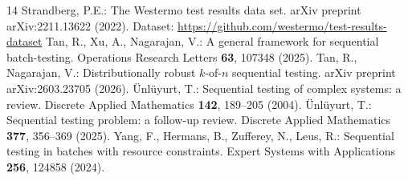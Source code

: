 \documentclass[runningheads]{llncs}
\begin{document}
\begin{thebibliography}{14}
Strandberg, P.E.:
The Westermo test results data set.
arXiv preprint arXiv:2211.13622 (2022).
Dataset: \url{https://github.com/westermo/test-results-dataset}
Tan, R., Xu, A., Nagarajan, V.:
A general framework for sequential batch-testing.
Operations Research Letters \textbf{63}, 107348 (2025).
Tan, R., Nagarajan, V.:
Distributionally robust $k$-of-$n$ sequential testing.
arXiv preprint arXiv:2603.23705 (2026).
\"Unl\"uyurt, T.:
Sequential testing of complex systems: a review.
Discrete Applied Mathematics \textbf{142}, 189--205 (2004).
\"Unl\"uyurt, T.:
Sequential testing problem: a follow-up review.
Discrete Applied Mathematics \textbf{377}, 356--369 (2025).
Yang, F., Hermans, B., Zufferey, N., Leus, R.:
Sequential testing in batches with resource constraints.
Expert Systems with Applications \textbf{256}, 124858 (2024).
\end{thebibliography}
\end{document}
